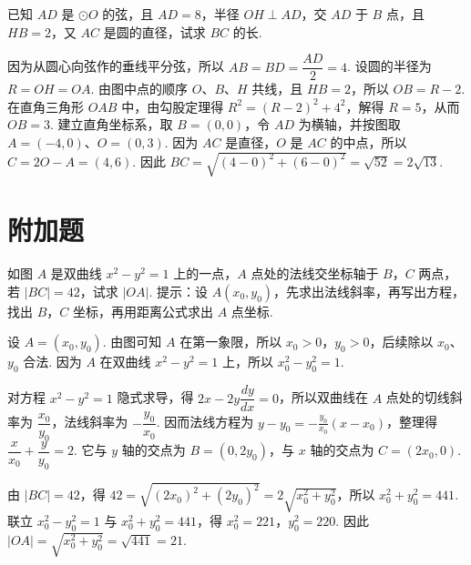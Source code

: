 \begin{problem}
已知 \(AD\) 是 \(\odot O\) 的弦，且 \(AD=8\)，半径 \(OH\perp AD\)，交 \(AD\) 于 \(B\) 点，且 \(HB=2\)，又 \(AC\) 是圆的直径，试求 \(BC\) 的长.

\end{problem}

\begin{solution}
因为从圆心向弦作的垂线平分弦，所以 \(AB=BD=\dfrac{AD}{2}=4\). 设圆的半径为 \(R=OH=OA\). 由图中点的顺序 \(O\)、\(B\)、\(H\) 共线，且 \(HB=2\)，所以 \(OB=R-2\). 在直角三角形 \(OAB\) 中，由勾股定理得 \(R^2=(R-2)^2+4^2\)，解得 \(R=5\)，从而 \(OB=3\). 建立直角坐标系，取 \(B=(0,0)\)，令 \(AD\) 为横轴，并按图取 \(A=(-4,0)\)、\(O=(0,3)\). 因为 \(AC\) 是直径，\(O\) 是 \(AC\) 的中点，所以 \(C=2O-A=(4,6)\). 因此 \(BC=\sqrt{(4-0)^2+(6-0)^2}=\sqrt{52}=2\sqrt{13}\).
\end{solution}

\section{附加题}

\begin{problem}
如图 \(A\) 是双曲线 \(x^{2}-y^{2}=1\) 上的一点，\(A\) 点处的法线交坐标轴于 \(B\)，\(C\) 两点，若 \(\left|BC\right|=42\)，试求 \(\left|OA\right|\). 提示：设 \(A(x_0,y_0)\)，先求出法线斜率，再写出方程，找出 \(B\)，\(C\) 坐标，再用距离公式求出 \(A\) 点坐标.

\end{problem}

\begin{solution}
设 \(A=(x_0,y_0)\). 由图可知 \(A\) 在第一象限，所以 \(x_0>0\)，\(y_0>0\)，后续除以 \(x_0\)、\(y_0\) 合法. 因为 \(A\) 在双曲线 \(x^2-y^2=1\) 上，所以 \(x_0^2-y_0^2=1\).

对方程 \(x^2-y^2=1\) 隐式求导，得 \(2x-2y\dfrac{dy}{dx}=0\)，所以双曲线在 \(A\) 点处的切线斜率为 \(\dfrac{x_0}{y_0}\)，法线斜率为 \(-\dfrac{y_0}{x_0}\). 因而法线方程为 \(y-y_0=-\frac{y_0}{x_0}(x-x_0)\)，整理得 \(\dfrac{x}{x_0}+\dfrac{y}{y_0}=2\). 它与 \(y\) 轴的交点为 \(B=(0,2y_0)\)，与 \(x\) 轴的交点为 \(C=(2x_0,0)\).

由 \(\left|BC\right|=42\)，得 \(42=\sqrt{(2x_0)^2+(2y_0)^2}=2\sqrt{x_0^2+y_0^2}\)，所以 \(x_0^2+y_0^2=441\). 联立 \(x_0^2-y_0^2=1\) 与 \(x_0^2+y_0^2=441\)，得 \(x_0^2=221\)，\(y_0^2=220\). 因此 \(\left|OA\right|=\sqrt{x_0^2+y_0^2}=\sqrt{441}=21\).
\end{solution}
